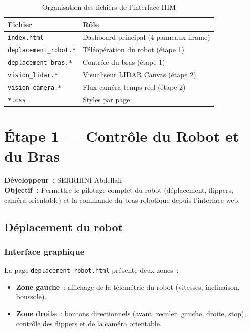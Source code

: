 \documentclass[12pt,a4paper]{report}
\begin{document}
\begin{table}[H]
\centering
\begin{tabularx}{\textwidth}{lX}
\toprule
\textbf{Fichier} & \textbf{Rôle} \\
\midrule
\texttt{index.html}              & Dashboard principal (4 panneaux iframe) \\
\texttt{deplacement\_robot.*}    & Téléopération du robot (étape 1) \\
\texttt{deplacement\_bras.*}     & Contrôle du bras (étape 1) \\
\texttt{vision\_lidar.*}         & Visualiseur LIDAR Canvas (étape 2) \\
\texttt{vision\_camera.*}        & Flux caméra temps réel (étape 2) \\
\texttt{*.css}                   & Styles par page \\
\bottomrule
\end{tabularx}
\caption{Organisation des fichiers de l'interface IHM}
\end{table}

\chapter{Étape 1 — Contrôle du Robot et du Bras}

\begin{tcolorbox}[colback=primary!10,colframe=primary]
\textbf{Développeur~:} SERRHINI Abdellah \\
\textbf{Objectif~:} Permettre le pilotage complet du robot (déplacement, flippers, caméra orientable) et la commande du bras robotique depuis l'interface web.
\end{tcolorbox}

\section{Déplacement du robot}

\subsection{Interface graphique}

La page \texttt{deplacement\_robot.html} présente deux zones~:
\begin{itemize}
  \item \textbf{Zone gauche}~: affichage de la télémétrie du robot (vitesses, inclinaison, boussole).
  \item \textbf{Zone droite}~: boutons directionnels (avant, reculer, gauche, droite, stop), contrôle des flippers et de la caméra orientable.
\end{itemize}
\end{document}
